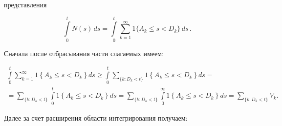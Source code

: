 представления





\vspace*{2pt}





\noindent


     $$


     \int\limits_0^t N(s)\,ds =\int\limits_0^t \sum\limits_{k=1}^\infty 1\{ A_k\leq 


s<D_k\}\,ds\,.


     $$




     Сначала после отбрасывания час\-ти сла\-га\-емых имеем:


     


     \vspace*{-6pt}


     


     \noindent


     \begin{multline*}


     \int\limits_0^t \sum\limits^\infty_{k=1} 1\left\{ A_k\leq s<D_k\right\}ds \geq 


     \int\limits_0^t \sum\limits_{\{k:D_k<t\}} 1\left\{ A_k\leq s<D_k\right\}ds={}\\


     {}= 


     \!\!\!\sum\limits_{\{ k:D_k<t\}} \int\limits_0^t 1\left\{ A_k\leq s<D_k\right\}ds= 


\!\!\!\sum\limits_{\{k: D_k<t\}} \int\limits_0^\infty 1\left\{ A_k\leq s< 


D_k\right\}ds=\!\!\!\sum\limits_{\{k: D_k<t\}}\!\!\!\! V_k.


     \end{multline*}




     Далее за счет расширения об\-ласти интегрирования получаем:


     


     \noindent


